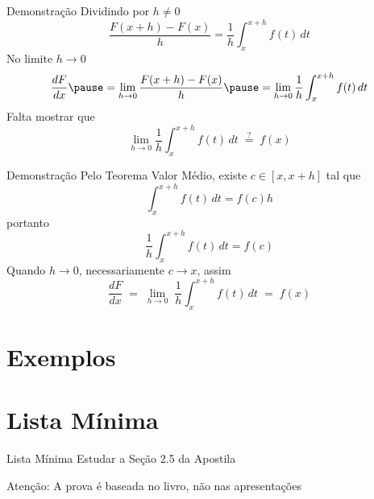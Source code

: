 \documentclass[fleqn,utf8,aspectratio=169,12pt]{beamer}
\begin{document}
\begin{proofframe}{Demonstração}
  Dividindo por $h\neq 0$
  \[
    \frac{F(x+h) - F(x)}{h} = \frac{1}{h} \int_x^{x+h} f(t)\,dt
  \]
  \pause
  No limite $h\to 0$
  \[
    \frac{dF}{dx}
    \pause
    = \lim_{h\to0} \frac{F(x+h) - F(x)}{h}
    \pause
    = \lim_{h\to0} \frac{1}{h} \int_x^{x+h} f(t)\,dt
  \]
  \pause
  Falta mostrar que
  \[
    \lim_{h\to 0} \frac{1}{h} \int_x^{x+h} f(t)\,dt \;\stackrel{?}{=}\; f(x)
  \]
\end{proofframe}

\begin{proofframe}{Demonstração}
  Pelo Teorema Valor Médio,
  \pause
  existe \(c\in[x, x+h]\) tal que
  \[
    \int_x^{x+h} f(t)\,dt = f(c)h
  \]
  \pause
  portanto
  \[
    \frac{1}{h} \int_x^{x+h} f(t)\,dt = f(c)
  \]
  \pause
  Quando $h\to0$,
  \pause
  necessariamente $c\to x$,
  \pause
  assim
  \[
    \frac{dF}{dx}
    \;=\; \lim_{h\to 0}\; \frac{1}{h} \int_x^{x+h} f(t)\,dt
    \;=\; f(x)
  \]
\end{proofframe}

\section{Exemplos}



\section{Lista Mínima}

\begin{frame}{Lista Mínima}
  Estudar a Seção 2.5 da Apostila

  \vfill
  Atenção: A prova é baseada no livro, não nas apresentações
\end{frame}

\end{document}
